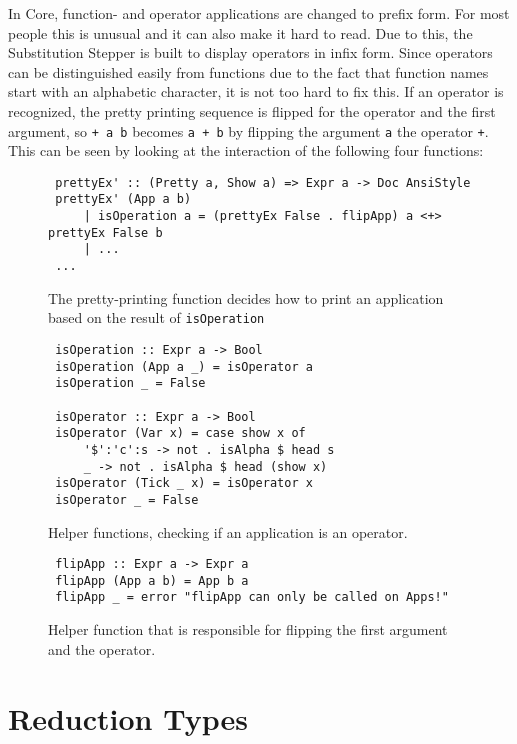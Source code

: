 In Core, function- and operator applications are changed to prefix form.
For most people this is unusual and it can also make it hard to read.
Due to this,
the Substitution Stepper is built to display operators in infix form.
Since operators can be distinguished easily from functions due to the fact that function names start with an alphabetic character,
it is not too hard to fix this.
If an operator is recognized,
the pretty printing sequence is flipped for the operator and the first argument,
so \texttt{+ a b} becomes \texttt{a + b} by flipping the argument \texttt{a} the operator \texttt{+}.
This can be seen by looking at the interaction of the following four functions:

\begin{figure}[!ht]
\begin{verbatim}
 prettyEx' :: (Pretty a, Show a) => Expr a -> Doc AnsiStyle
 prettyEx' (App a b)
     | isOperation a = (prettyEx False . flipApp) a <+> prettyEx False b
     | ...
 ...
\end{verbatim}
    \caption{The pretty-printing function decides how to print an application based on the result of \texttt{isOperation}}
\end{figure}

\begin{figure}[!ht]
\begin{verbatim}
 isOperation :: Expr a -> Bool
 isOperation (App a _) = isOperator a
 isOperation _ = False
 
 isOperator :: Expr a -> Bool
 isOperator (Var x) = case show x of
     '$':'c':s -> not . isAlpha $ head s
     _ -> not . isAlpha $ head (show x)
 isOperator (Tick _ x) = isOperator x
 isOperator _ = False

\end{verbatim}
    \caption{Helper functions, checking if an application is an operator.}
\end{figure}

\begin{figure}[!ht]
\begin{verbatim}
 flipApp :: Expr a -> Expr a
 flipApp (App a b) = App b a
 flipApp _ = error "flipApp can only be called on Apps!"    
\end{verbatim}
    \caption{Helper function that is responsible for flipping the first argument and the operator.}
\end{figure}

\section{Reduction Types}

